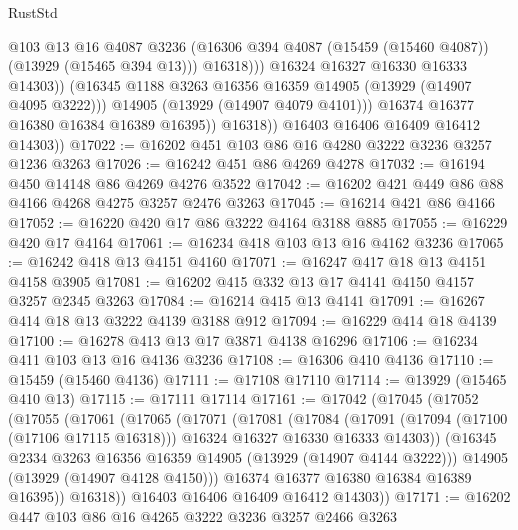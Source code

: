 \begin{lexlean}{RustStd}
\begin{coremodule}
{\begin{coremodule}
{{{{{{{{{{{{{{{{{{{{{{{{{{{{{{{{{{{{{                            @103
                            @13
                            @16
                            @4087
                            @3236
                            (@16306 @394 @4087 (@15459 (@15460 @4087)) (@13929 (@15465 @394 @13)))
                            @16318)))
                      @16324
                      @16327
                      @16330
                      @16333
                      @14303))
                  (@16345 @1188 @3263 @16356 @16359 @14905 (@13929 (@14907 @4095 @3222)))
                  @14905
                  (@13929 (@14907 @4079 @4101)))
                @16374
                @16377
                @16380
                @16384
                @16389
                @16395))
            @16318))
        @16403
        @16406
        @16409
        @16412
        @14303))
@17022 := @16202 @451 @103 @86 @16 @4280 @3222 @3236 @3257 @1236 @3263
@17026 := @16242 @451 @86 @4269 @4278
@17032 := @16194 @450 @14148 @86 @4269 @4276 @3522
@17042 := @16202 @421 @449 @86 @88 @4166 @4268 @4275 @3257 @2476 @3263
@17045 := @16214 @421 @86 @4166
@17052 := @16220 @420 @17 @86 @3222 @4164 @3188 @885
@17055 := @16229 @420 @17 @4164
@17061 := @16234 @418 @103 @13 @16 @4162 @3236
@17065 := @16242 @418 @13 @4151 @4160
@17071 := @16247 @417 @18 @13 @4151 @4158 @3905
@17081 := @16202 @415 @332 @13 @17 @4141 @4150 @4157 @3257 @2345 @3263
@17084 := @16214 @415 @13 @4141
@17091 := @16267 @414 @18 @13 @3222 @4139 @3188 @912
@17094 := @16229 @414 @18 @4139
@17100 := @16278 @413 @13 @17 @3871 @4138 @16296
@17106 := @16234 @411 @103 @13 @16 @4136 @3236
@17108 := @16306 @410 @4136
@17110 := @15459 (@15460 @4136)
@17111 := @17108 @17110
@17114 := @13929 (@15465 @410 @13)
@17115 := @17111 @17114
@17161 := @17042
    (@17045
      (@17052
        (@17055
          (@17061
            (@17065
              (@17071
                (@17081
                  (@17084
                    (@17091
                      (@17094 (@17100 (@17106 @17115 @16318)))
                      @16324
                      @16327
                      @16330
                      @16333
                      @14303))
                  (@16345 @2334 @3263 @16356 @16359 @14905 (@13929 (@14907 @4144 @3222)))
                  @14905
                  (@13929 (@14907 @4128 @4150)))
                @16374
                @16377
                @16380
                @16384
                @16389
                @16395))
            @16318))
        @16403
        @16406
        @16409
        @16412
        @14303))
@17171 := @16202 @447 @103 @86 @16 @4265 @3222 @3236 @3257 @2466 @3263
}}}}}}}}}}}}}}}}}}}}}}}}}}}}}}}}}}}}}
\end{coremodule}}
\end{coremodule}
\end{lexlean}
